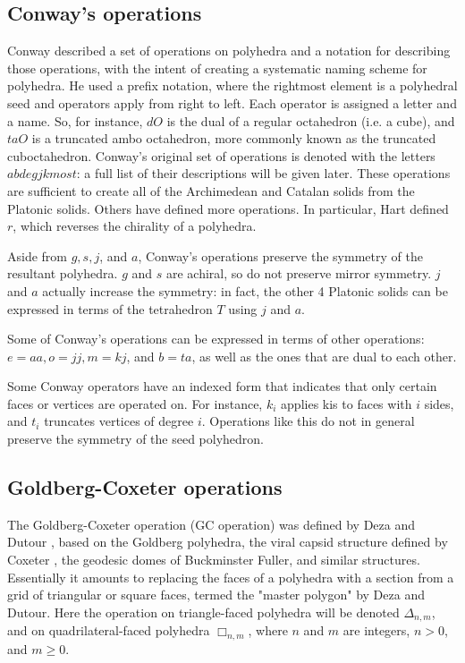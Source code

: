 \documentclass{amsart}[12pt]
\begin{document}
\subsection{Conway's operations}
Conway described a set of operations on polyhedra and a notation for describing
those operations, with the intent of creating a systematic naming scheme for
polyhedra.\cite{conway} He used a prefix notation, where the rightmost element
is a polyhedral seed and operators apply from right to left. Each operator is
assigned a letter and a name. So, for instance, $dO$ is the dual of a regular
octahedron (i.e. a cube), and $taO$ is a truncated ambo octahedron, more
commonly known as the truncated cuboctahedron. Conway's original set of
operations is denoted with the letters $abdegjkmost$: a full list of their
descriptions will be given later. These operations are sufficient to create all
of the Archimedean and Catalan solids from the Platonic solids. Others have
defined more operations. \cite{hart98}\cite{hart00}\cite{antiprism}
In particular, Hart \cite{hart98} defined $r$,
which reverses the chirality of a polyhedra.

Aside from $g, s, j$, and $a$, Conway's operations preserve the
symmetry of the resultant polyhedra. $g$ and $s$ are achiral, so
do not preserve mirror symmetry. $j$ and $a$ actually increase
the symmetry: in fact, the other 4 Platonic solids can be expressed
in terms of the tetrahedron $T$ using $j$ and $a$.

Some of Conway's operations can be expressed in terms of other operations:
$e=aa, o=jj, m=kj$, and $b=ta$, as well as the ones that are dual to each other.

Some Conway operators have an indexed form that indicates that only certain faces or
vertices are operated on. For instance, $k_i$ applies kis to faces with
$i$ sides, and $t_i$ truncates vertices of degree $i$.
Operations like this do not in general preserve the symmetry of the seed
polyhedron.

\subsection{Goldberg-Coxeter operations}
The Goldberg-Coxeter operation (GC operation) was defined by Deza and Dutour
\cite{dutour}, based on the Goldberg polyhedra, the viral capsid structure
defined by Coxeter \cite{coxeter71}, the geodesic domes of Buckminster Fuller,
and similar structures. Essentially it amounts to replacing the faces of a
polyhedra with a section from a grid of triangular or square faces, termed the
"master polygon" by Deza and Dutour. Here the operation on triangle-faced
polyhedra will be denoted $\Delta_{n,m}$, and on quadrilateral-faced polyhedra
$\Box_{n,m}$, where $n$ and $m$ are integers, $n > 0$, and $m \ge 0$.
\end{document}
